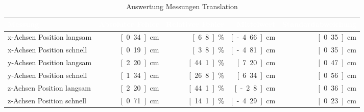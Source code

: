 \begin{table}[htbp]
     \centering
     \caption{Auswertung Messungen Translation}
     \label{tab:auswertung_tran}
     \begin{tabularx}{\textwidth}{|X|r|r|r|r|} 
		\hline
		\rowcolor{bfhblue}
		\textcolor{white}{Messung} & \textcolor{white}{Absoluter Fehler} & \textcolor{white}{Relativer Fehler} & \textcolor{white}{Mittelwert}  & \textcolor{white}{Standardabweichung}\\
		\hline
		x-Achsen Position langsam & \unit[0.34]{cm} & \unit[6.8]{\%} & \unit[-4.66]{cm} & \unit[0.35]{cm}\\
		\hline
		x-Achsen Position schnell & \unit[0.19]{cm} & \unit[3.8]{\%} & \unit[-4.81]{cm} & \unit[0.35]{cm} \\
		\hline
		y-Achsen Position langsam & \unit[2.20]{cm} & \unit[44.1]{\%} & \unit[7.20]{cm} & \unit[0.47]{cm}\\
		\hline
		y-Achsen Position schnell & \unit[1.34]{cm} & \unit[26.8]{\%} & \unit[6.34]{cm} & \unit[0.56]{cm} \\
		\hline
		z-Achsen Position langsam & \unit[2.20]{cm} & \unit[44.1]{\%} & \unit[-2.8]{cm} & \unit[0.36]{cm} \\
		\hline
		z-Achsen Position schnell & \unit[0.71]{cm} & \unit[14.1]{\%} & \unit[-4.29]{cm} & \unit[0.23]{cm}\\
		\hline
     \end{tabularx}  
\end{table}